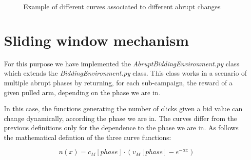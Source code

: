 \begin{figure}[!htb]
	\caption{Example of different curves associated to different abrupt changes}
	\label{abruptFigure}
\end{figure}


\section{Sliding window mechanism}
For this purpose we have implemented the \textit{AbruptBiddingEnvironment.py} class which extends the \textit{BiddingEnvironment.py} class. This class works in a scenario of multiple abrupt phases by returning, for each sub-campaign, the reward of a given pulled arm, depending on the phase we are in.

In this case, the functions generating  the number of clicks given a bid value can change dynamically, according the phase we are in.
The curves differ from the previous definitions only for the dependence to the phase we are in. As follows the mathematical defintion of the three curve functions:

\begin{equation}
	n(x) = c_{M}[phase] \cdot (v_{M}[phase] - e^{-\alpha x})
\end{equation}

